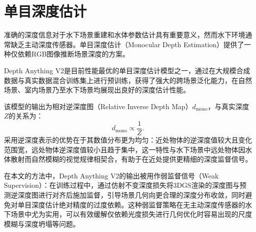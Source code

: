 \section{单目深度估计}

准确的深度信息对于水下场景重建和水体参数估计具有重要意义，然而水下环境通常缺乏主动深度传感器。单目深度估计（Monocular Depth Estimation）提供了一种仅依赖RGB图像推断场景深度的方案。

Depth Anything V2是目前性能最优的单目深度估计模型之一，通过在大规模合成数据与真实数据混合训练集上进行预训练，获得了强大的跨场景泛化能力，在自然场景、室内场景乃至水下场景均展现出良好的深度估计性能。

该模型的输出为相对逆深度图（Relative Inverse Depth Map）$d_{\mathrm{mono}}$，与真实深度$Z$的关系为：
\begin{equation}
    d_{\mathrm{mono}} \propto \frac{1}{Z}.
    \label{eq:inv_depth}
\end{equation}采用逆深度表示的优势在于其数值分布更为均匀：近处物体的逆深度值较大且变化范围宽，远处物体逆深度值较小且趋于集中，这一特性与水下场景中远处物体因水体散射而自然模糊的视觉规律相契合，有助于在近处提供更精细的深度监督信号。

在本文的方法中，Depth Anything V2的输出被用作弱监督信号（Weak Supervision）：在训练过程中，通过仿射不变深度损失将3DGS渲染的深度图与预测逆深度图进行对齐后施加监督，引导场景几何向更合理的深度分布收敛，同时避免对单目深度估计绝对精度的过度依赖。这种弱监督策略在无主动深度传感器的水下场景中尤为实用，可以有效缓解仅依赖光度损失进行几何优化时容易出现的尺度模糊与深度坍塌等问题。
